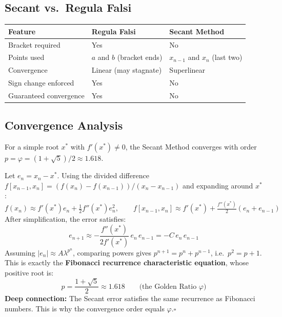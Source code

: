 \documentclass[12pt]{article}
\newcommand{\hcell}[1]{\textbf{\color{white}#1}}
\begin{document}
\bigskip

\subsection*{Secant vs.\ Regula Falsi}

\begin{center}
{\small
\begin{tabular}{p{4.5cm} p{4.5cm} p{4.5cm}}
\toprule
\rowcolor{primary}
\hcell{Feature} & \hcell{Regula Falsi} & \hcell{Secant Method} \\
\midrule
\rowcolor{amberbg}
Bracket required & Yes & No \\
Points used & $a$ and $b$ (bracket ends) & $x_{n-1}$ and $x_n$ (last two) \\
\rowcolor{amberbg}
Convergence & Linear (may stagnate) & Superlinear \\
Sign change enforced & Yes & No \\
\rowcolor{amberbg}
Guaranteed convergence & Yes & No \\
\bottomrule
\end{tabular}
}
\end{center}

\bigskip

\subsection*{Convergence Analysis}

\begin{thmbox}
For a simple root $x^*$ with $f'(x^*)\neq 0$, the Secant Method converges with order $p=\varphi=(1+\sqrt{5})/2\approx 1.618$.
\end{thmbox}

\begin{derivbox}
Let $e_n=x_n-x^*$. Using the divided difference $f[x_{n-1},x_n]=(f(x_n)-f(x_{n-1}))/(x_n-x_{n-1})$ and expanding around $x^*$:
\[
  f(x_n)\approx f'(x^*)e_n + \tfrac{1}{2}f''(x^*)e_n^2, \qquad f[x_{n-1},x_n]\approx f'(x^*) + \tfrac{f''(x^*)}{2}(e_n+e_{n-1})
\]
After simplification, the error satisfies:
\[
  e_{n+1} \approx -\frac{f''(x^*)}{2f'(x^*)}\,e_n\,e_{n-1} = -C\,e_n\,e_{n-1}
\]
Assuming $|e_n|\approx A\lambda^{p^n}$, comparing powers gives $p^{n+1}=p^n+p^{n-1}$, i.e.\ $p^2=p+1$. This is exactly the \textbf{Fibonacci recurrence characteristic equation}, whose positive root is:
\[
  p = \frac{1+\sqrt{5}}{2} \approx 1.618 \qquad\text{(the Golden Ratio }\varphi\text{)}
\]
\textbf{Deep connection:} The Secant error satisfies the same recurrence as Fibonacci numbers. This is why the convergence order equals $\varphi$.\hfill$\square$
\end{derivbox}
\end{document}
